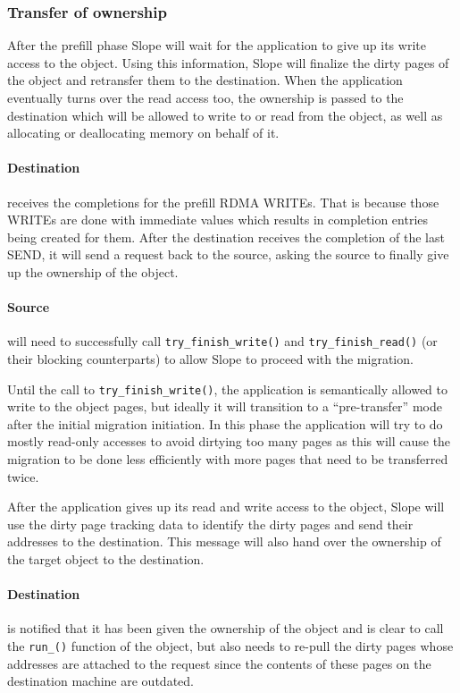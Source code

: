 \subsubsection{Transfer of ownership}
\label{sec:transowner}
After the prefill phase Slope will wait for the application to give up its write
access to the object. Using this information, Slope will finalize the dirty
pages of the object and retransfer them to the destination. When the
application eventually turns over the read access too, the ownership is passed
to the destination which will be allowed to write to or read from the object,
as well as allocating or deallocating memory on behalf of it.

\paragraph{Destination} receives the completions for the prefill RDMA WRITEs.
That is because those WRITEs are done with immediate values which results
in completion entries being created for them. After the destination
receives the completion of the
last SEND, it will send a request back to the source, asking the source to
finally give up the ownership of the object.

\paragraph{Source} will need to successfully call
\texttt{try\_finish\_write()} and \texttt{try\_finish\_read()} (or their
blocking counterparts) to allow Slope to proceed with the migration.

Until the call to \texttt{try\_finish\_write()}, the application is 
semantically allowed to write to the object pages, but ideally it will
transition to a ``pre-transfer'' mode after the initial migration
initiation. In this phase the application will try to do mostly read-only
accesses to avoid dirtying too many pages as this will cause the migration
to be done less efficiently with more pages that need to be transferred twice.

After the application gives up its read and write access to the object,
Slope will use the dirty
page tracking data to identify the dirty pages and send their addresses
to the destination. This message will also hand over the ownership
of the target object to the destination.

\paragraph{Destination} is notified that it has been given the ownership of
the object and is clear to call the \texttt{run\_()} function of the object,
but also needs to re-pull the dirty pages whose addresses are attached to the
request since the contents of these pages on the destination machine are
outdated.

